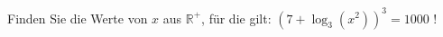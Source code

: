 \item Finden Sie die Werte von $x$ aus $\mathbb{R}^{+}$, für die gilt: $\left(7+\log_3(x^2)\right)^3=1000$ !


